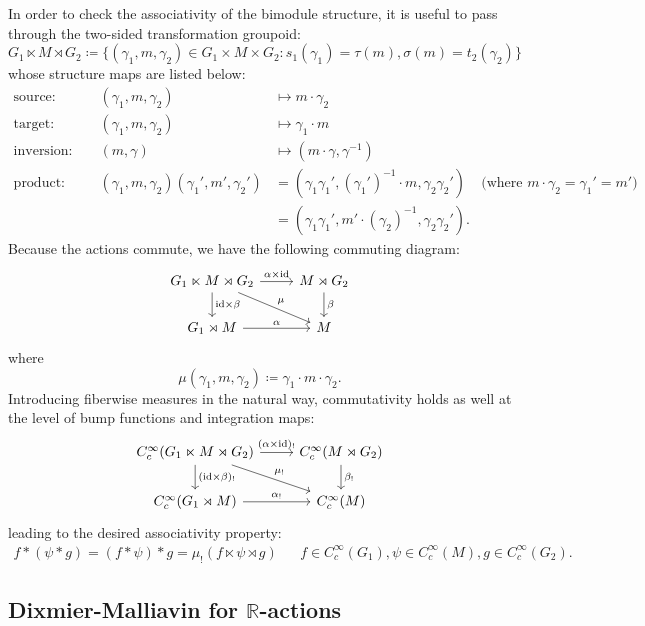 \documentclass[12pt]{article}
\theoremstyle{plain}
\theoremstyle{definition}
\newcommand{\R}{\mathbb{R}}
\newcommand{\id}{\mathrm{id}}
\numberwithin{equation}{section}
\begin{document}
In order to check the associativity of the bimodule structure, it is useful to pass through the two-sided transformation groupoid:
\[G_1 \ltimes M \rtimes G_2  
\coloneqq
\{ (\gamma_1,m,\gamma_2) \in G_1 \times M \times G_2 : s_1(\gamma_1)=\tau(m),\sigma(m)=t_2(\gamma_2) \} \]
whose structure maps are listed below:
\begin{align*}
\text{source: } &&(\gamma_1,m,\gamma_2) &\mapsto m \cdot \gamma_2   &\\
\text{target: } &&(\gamma_1,m,\gamma_2) &\mapsto \gamma_1 \cdot m &\\
\text{inversion: } &&(m,\gamma)   &\mapsto (m\cdot\gamma,\gamma^{-1}) &\\
\text{product: } &&(\gamma_1,m,\gamma_2) (\gamma_1',m',\gamma_2') 
&= (\gamma_1\gamma_1',(\gamma_1')^{-1}\cdot m,\gamma_2\gamma_2') & \text{(where $m \cdot \gamma_2 = \gamma_1'=m'$)}  \\
&&&= (\gamma_1\gamma_1',m'\cdot(\gamma_2)^{-1},\gamma_2\gamma_2').  &
\end{align*}
Because the actions commute, we have the following commuting diagram:
\[ \begin{tikzcd}
G_1 \ltimes M \rtimes G_2 \ar[rd,"{\mu}"] \ar[r,"{\alpha \times \id}"] \ar[d,"{\id \times \beta}"] & M \rtimes G_2 \ar[d,"{\beta}"] \\
G_1 \rtimes M \ar[r,"\alpha"] & M
\end{tikzcd} \]
where 
\[ \mu(\gamma_1,m,\gamma_2) \coloneqq \gamma_1 \cdot m \cdot \gamma_2. \]
Introducing fiberwise measures in the natural way, commutativity  holds as well at the level of bump functions and integration maps:
\[ \begin{tikzcd}
C_c^\infty(G_1 \ltimes M \rtimes G_2) \ar[rd,"{\mu_!}"] \ar[r,"{(\alpha \times \id)_!}"] \ar[d,"{(\id \times \beta)_!}"] & C_c^\infty(M \rtimes G_2) \ar[d,"{\beta_!}"] \\
C_c^\infty(G_1 \rtimes M) \ar[r,"\alpha_!"] & C_c^\infty(M)
\end{tikzcd} \]
leading to the desired associativity property:
\begin{align*}
f*(\psi*g) = (f*\psi)*g = \mu_!(f \ltimes \psi \rtimes g) && f\in C_c^\infty(G_1),\psi \in C_c^\infty(M), g \in C_c^\infty(G_2).
\end{align*}




\subsection{Dixmier-Malliavin for \texorpdfstring{$\R$}{R}-actions}
\end{document}
